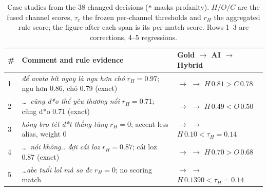﻿\begin{table}[ht]
\centering
\scriptsize
\setlength{\tabcolsep}{3pt}
\renewcommand{\arraystretch}{1.0}
\caption{Case studies from the 38 changed decisions (\texttt{*} masks profanity).
$H/O/C$ are the fused channel scores, $\tau_c$ the frozen per-channel thresholds and
$r_H$ the aggregated \hate{} rule score; the figure after each span is its per-match
score. Rows 1--3 are corrections, 4--5 regressions.}
\label{tab:cases}
\begin{tabularx}{\textwidth}{@{}l>{\raggedright\arraybackslash}p{6.3cm}>{\raggedright\arraybackslash}X@{}}
\toprule
\# & Comment and rule evidence & Gold $\to$ AI $\to$ Hybrid \\
\midrule
1 & \emph{để avata bít ngay là ngu hơn chó} \newline $r_H{=}0.97$; ngu hơn 0.86, chó 0.79 (exact)
  & \hate{} $\to$ \clean{} $\to$ \hate{} \newline $H\,0.81 > C\,0.78$ \\
2 & \emph{\dots\ cũng đ*o thể yêu thương nổi} \newline $r_H{=}0.71$; cũng đ*o 0.71 (exact)
  & \hate{} $\to$ \off{} $\to$ \hate{} \newline $H\,0.49 < O\,0.50$ \\
3 & \emph{hóng bro tét đ*t thằng tùng} \newline $r_H{=}0$; accent-less alias, weight 0
  & \clean{} $\to$ \hate{} $\to$ \clean{} \newline $H\,0.10 < \tau_H{=}0.14$ \\
\midrule
4 & \emph{\dots\ nói không.. đợi cái loz} \newline $r_H{=}0.87$; cái loz 0.87 (exact)
  & \off{} $\to$ \off{} $\to$ \hate{} \newline $H\,0.70 > O\,0.68$ \\
5 & \emph{\dots abe tuổi lol mà so đc} \newline $r_H{=}0$; no scoring match
  & \hate{} $\to$ \hate{} $\to$ \clean{} \newline $H\,0.1390 < \tau_H{=}0.14$ \\
\bottomrule
\end{tabularx}
\end{table}

